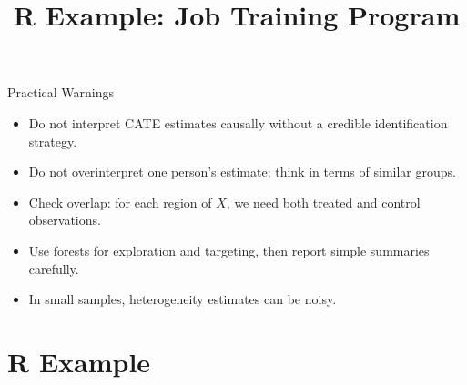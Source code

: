 \documentclass[hyperref={pdfpagelabels=false}]{beamer}
\begin{document}
\begin{frame}{Practical Warnings}
\begin{itemize}
  \item Do not interpret CATE estimates causally without a credible identification strategy.
  \vspace{0.2cm}
  \item Do not overinterpret one person's estimate; think in terms of similar groups.
  \vspace{0.2cm}
  \item Check overlap: for each region of $X$, we need both treated and control observations.
  \vspace{0.2cm}
  \item Use forests for exploration and targeting, then report simple summaries carefully.
  \vspace{0.2cm}
  \item In small samples, heterogeneity estimates can be noisy.
\end{itemize}
\end{frame}

\title[]
{R Example: Job Training Program}

\subtitle{}
\author{}
\institute{}
\date{}

\begin{frame}{}
  \titlepage
\end{frame}

\section{R Example}
\end{document}
